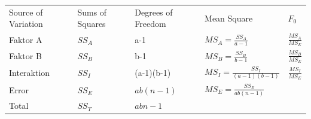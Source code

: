 \documentclass[11pt]{article}
\begin{document}
\begin{table}[H]
\centering
\begin{tabular}{lllll}
Source of Variation & Sums of Squares & Degrees of Freedom & Mean Square & $F_0$               \\
Faktor A               & $SS_A$          & a-1                & $MS_A=\frac{SS_A}{a-1}$      & $\frac{MS_A}{MS_E}$ \\
Faktor B               & $SS_B$          & b-1                & $MS_B=\frac{SS_B}{b-1}$      & $\frac{MS_B}{MS_E}$ \\
Interaktion              & $SS_I$          & (a-1)(b-1)                & $MS_I=\frac{SS_I}{(a-1)(b-1)}$      & $\frac{MS_I}{MS_E}$ \\
Error               & $SS_E$          & $ab(n-1)$           & $MS_E=\frac{SS_E}{ab(n-1)}$      &                     \\
Total               & $SS_T$          & $abn-1$             &             &                    
\end{tabular}
\end{table}

\newpage
\end{document}
